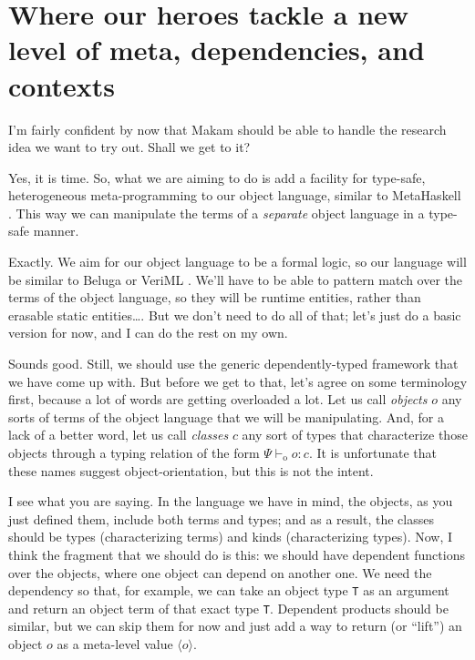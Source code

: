 \section{Where our heroes tackle a new level of meta, dependencies, and
contexts}\label{where-our-heroes-tackle-a-new-level-of-meta-dependencies-and-contexts}

\heroSTUDENT{} I'm fairly confident by now that Makam should be able to handle
the research idea we want to try out. Shall we get to it?

\heroADVISOR{} Yes, it is time. So, what we are aiming to do is add a facility
for type-safe, heterogeneous meta-programming to our object language,
similar to MetaHaskell \citep{mainland2012explicitly}. This way we can
manipulate the terms of a \emph{separate} object language in a type-safe
manner.

\heroSTUDENT{} Exactly. We aim for our object language to be a formal logic,
so our language will be similar to Beluga \citep{beluga-main-reference}
or VeriML \citep{veriml-main-reference}. We'll have to be able to
pattern match over the terms of the object language, so they will be
runtime entities, rather than erasable static entities\ldots{}. But we
don't need to do all of that; let's just do a basic version for now, and
I can do the rest on my own.

\newcommand\dep[1]{\ensuremath{#1}}
\newcommand\lift[1]{\ensuremath{\langle#1\rangle}}
\newcommand\odash[0]{\ensuremath{\vdash_{\text{o}}}}
\newcommand\wf[0]{\ensuremath{\; \text{wf}}}
\newcommand\aq[1]{\ensuremath{\texttt{aq}(#1)}}

\heroADVISOR{} Sounds good. Still, we should use the generic dependently-typed
framework that we have come up with. But before we get to that, let's
agree on some terminology first, because a lot of words are getting
overloaded a lot. Let us call \emph{objects} \(o\) any sorts of terms of
the object language that we will be manipulating. And, for a lack of a
better word, let us call \emph{classes} \(c\) any sort of types that
characterize those objects through a typing relation of the form
\(\Psi \odash o : c\). It is unfortunate that these names suggest
object-orientation, but this is not the intent.

\heroSTUDENT{} I see what you are saying. In the language we have in mind, the
objects, as you just defined them, include both terms and types; and as
a result, the classes should be types (characterizing terms) and kinds
(characterizing types). Now, I think the fragment that we should do is
this: we should have dependent functions over the objects, where one
object can depend on another one. We need the dependency so that, for
example, we can take an object type \texttt{T} as an argument and return
an object term of that exact type \texttt{T}. Dependent products should
be similar, but we can skip them for now and just add a way to return
(or ``lift'') an object \(o\) as a meta-level value \(\lift{o}\).

